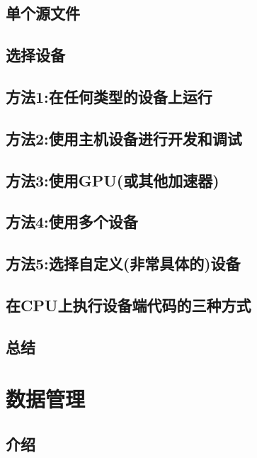 \documentclass[11pt,a4paper,UTF8]{ctexart}
\begin{document}
		\subsection{单个源文件}
		
		\subsection{选择设备}
		
		\subsection{方法1:在任何类型的设备上运行}
		
		\subsection{方法2:使用主机设备进行开发和调试}
		
		\subsection{方法3:使用GPU(或其他加速器)}
		
		\subsection{方法4:使用多个设备}
		
		\subsection{方法5:选择自定义(非常具体的)设备}
		
		\subsection{在CPU上执行设备端代码的三种方式}
		
		\subsection{总结}
		
	\section{数据管理}
		\subsection{介绍}
\end{document}
